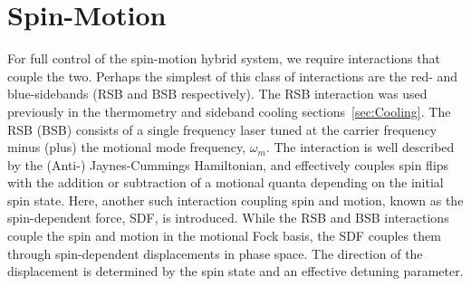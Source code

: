 \section{Spin-Motion}
    For full control of the spin-motion hybrid system, we require interactions
    that couple the two. Perhaps the simplest of this class of interactions
    are the red- and blue-sidebands (RSB and BSB respectively). The  RSB
    interaction was used previously in the thermometry and sideband cooling
    sections~\ref{sec:Cooling}. The RSB (BSB) consists of a single frequency
    laser tuned at the carrier frequency minus (plus) the motional mode frequency,
    $\omega_m$. The interaction is well described by the (Anti-) Jaynes-Cummings
    Hamiltonian, and effectively couples spin flips with the addition or
    subtraction of a motional quanta depending on the initial spin state. Here,
    another such interaction coupling spin and motion, known as the
    spin-dependent force, SDF, is introduced. 
    While the RSB and BSB interactions couple the spin and motion in the motional Fock basis, the SDF couples them through spin-dependent displacements in phase space. The direction of the displacement is determined by the spin state and an effective detuning parameter.

